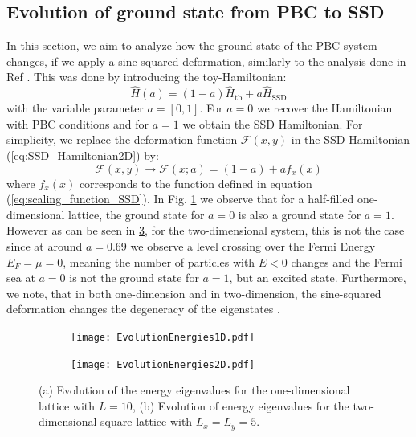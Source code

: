 \documentclass[11pt, a4paper, oneside]{book}
\theoremstyle{definition} %
\begin{document}
\subsection{Evolution of ground state from PBC to SSD}
In this section, we aim to analyze how the ground state of the PBC system changes, if we apply a sine-squared deformation, similarly to the analysis done in Ref \cite{Maruyama}. This was done by introducing the toy-Hamiltonian:
\begin{equation}
	\hat{H}(a) = (1-a)\hat{H}_\text{tb} + a \hat{H}_{\text{SSD}}
\end{equation}
with the variable parameter $a =[0,1]$. For $a=0$ we recover the Hamiltonian with PBC conditions and for $a=1$ we obtain the SSD Hamiltonian. For simplicity, we replace the deformation function $\mathcal{F}(x,y)$ in the SSD Hamiltonian (\ref{eq:SSD_Hamiltonian2D}) by:
\begin{equation}
	\mathcal{F}(x,y) \rightarrow \mathcal{F}(x;a) = (1-a) + af_x(x) 
\end{equation}
where $f_x(x)$ corresponds to the function defined in equation (\ref{eq:scaling_function_SSD}). In Fig. \ref{EvolutionEnergies1D} we observe that for a half-filled one-dimensional lattice, the ground state for $a=0$ is also a ground state for $a=1$. However as can be seen in \ref{EvolutionEnergies2D}, for the two-dimensional system, this is not the case since at around $a = 0.69$ we observe a level crossing over the Fermi Energy $E_F = \mu =0$, meaning the number of particles with $E<0$ changes and the Fermi sea at $a=0$ is not the ground state for $a=1$, but an excited state. Furthermore, we note, that in both one-dimension and in two-dimension, the sine-squared deformation changes the degeneracy of the eigenstates \cite{Maruyama}.

\begin{figure}[h]
\begin{subfigure}{.5\textwidth}
  \centering
  \texttt{[image: EvolutionEnergies1D.pdf]}
  \caption{}
  \label{EvolutionEnergies1D}
\end{subfigure}
\begin{subfigure}{.5\textwidth}
  \centering
  \texttt{[image: EvolutionEnergies2D.pdf]}  
  \caption{}
  \label{EvolutionEnergies2D}
\end{subfigure}
\caption{(a) Evolution of the energy eigenvalues for the one-dimensional lattice with $L = 10$, (b) Evolution of energy eigenvalues for the two-dimensional square lattice with $L_x = L_y = 5$.}
\end{figure}
\end{document}
